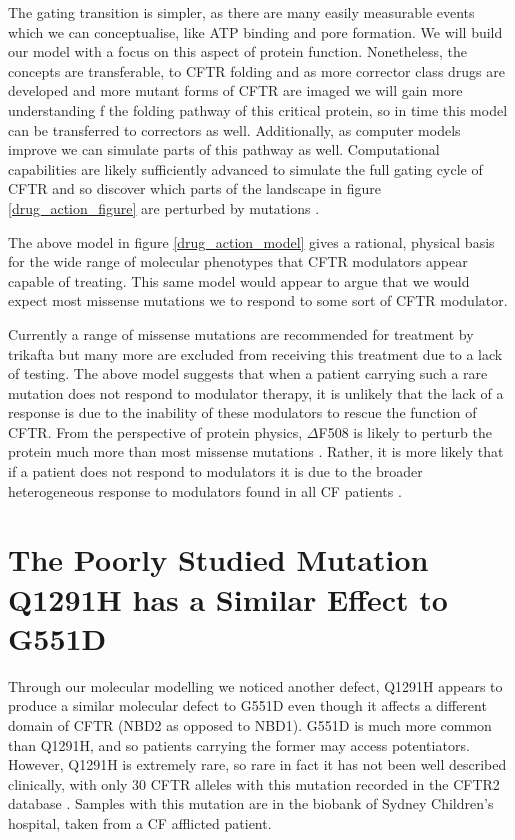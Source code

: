 The gating transition is simpler, as there are many easily measurable events which we can conceptualise, like ATP binding and pore formation. We will build our model with a focus on this aspect of protein function. Nonetheless, the concepts are transferable, to CFTR folding and as more corrector class drugs are developed and more mutant forms of CFTR are imaged we will gain more understanding f the folding pathway of this critical protein, so in time this model can be transferred to correctors as well. Additionally, as computer models improve we can simulate parts of this pathway as well. Computational capabilities are likely sufficiently advanced to simulate the full gating cycle of CFTR and so discover which parts of the landscape in figure \ref{drug_action_figure} are perturbed by mutations \cite{}. 

The above model in figure \ref{drug_action_model} gives a rational, physical basis for the wide range of molecular phenotypes that CFTR modulators appear capable of treating. This same model would appear to argue that we would expect most missense mutations we to respond to some sort of CFTR modulator. 

Currently a range of missense mutations are recommended for treatment by trikafta but many more are excluded from receiving this treatment due to a lack of testing. The above model suggests that when a patient carrying such a rare mutation does not respond to modulator therapy, it is unlikely that the lack of a response is due to the inability of these modulators to rescue the function of CFTR. From the perspective of protein physics, $\Delta$F508 is likely to perturb the protein much more than most missense mutations \cite{}. Rather, it is more likely that if a patient does not respond to modulators it is due to the broader heterogeneous response to modulators found in all CF patients \cite{}. 


\section{The Poorly Studied Mutation Q1291H has a Similar Effect to G551D}

Through our molecular modelling we noticed another defect, Q1291H appears to produce a similar molecular defect to G551D even though it affects a different domain of CFTR (NBD2 as opposed to NBD1). G551D is much more common than Q1291H, and so patients carrying the former may access potentiators. However, Q1291H is extremely rare, so rare in fact it has not been well described clinically, with only 30 CFTR alleles with this mutation recorded in the CFTR2 database \cite{cftr2}. Samples with this mutation are in the biobank of Sydney Children's hospital, taken from a CF afflicted patient. 


